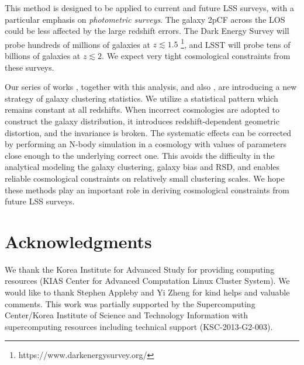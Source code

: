 \documentclass[iop]{emulateapj}
\begin{document}

This method is designed to be applied to current and future LSS surveys,
with a particular emphasis on {\it photometric surveys}.
The galaxy 2pCF across the LOS could be less affected by the large redshift errors.
The Dark Energy Survey will probe hundreds of millions of galaxies at $z\lesssim1.5$
\footnote{https://www.darkenergysurvey.org/}, 
and LSST will probe tens of billions of galaxies at $z\lesssim2$.
We expect very tight cosmological constraints from these surveys.

Our series of works \cite{Li2014,Li2015,Li2016}, together with this analysis, 
and also \cite{topology,MS2016},
are introducing a new strategy of galaxy clustering statistics.
We utilize a statistical pattern which remains constant at all redshifts.
When incorrect cosmologies are adopted to construct the galaxy distribution, it introduces redshift-dependent geometric distortion,
and the invariance is broken.
The systematic effects can be corrected by performing an N-body simulation 
in a cosmology with values of parameters close enough to the underlying correct one.
This avoids the difficulty in the analytical modeling the galaxy clustering, galaxy bias and RSD,
and enables reliable cosmological constraints on relatively small clustering scales.
We hope these methods play an important role in deriving cosmological constraints from future LSS surveys. 
 
\section*{Acknowledgments}

We thank the Korea Institute for Advanced Study for providing computing resources (KIAS Center for Advanced Computation Linux Cluster System).
We would like to thank Stephen Appleby and Yi Zheng for kind helps and valuable comments.
This work was partially supported by the
Supercomputing Center/Korea Institute of Science and
Technology Information with supercomputing resources
including technical support (KSC-2013-G2-003).
\end{document}

